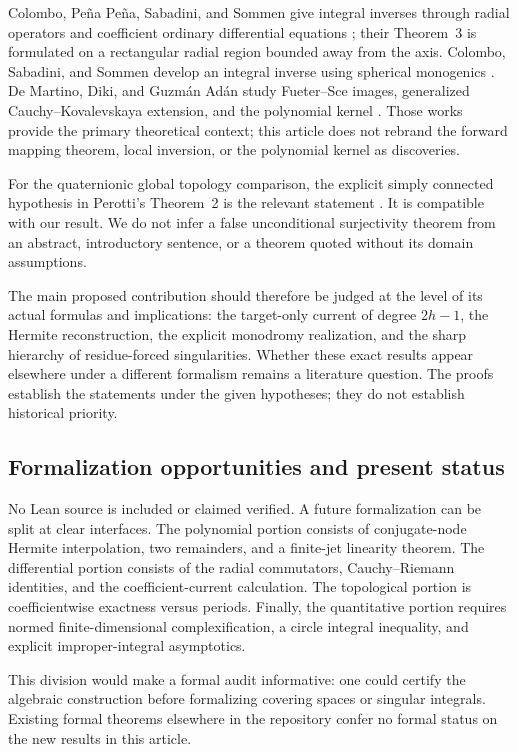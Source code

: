 \documentclass[11pt,a4paper]{article}
\numberwithin{equation}{section}
\theoremstyle{definition}
\theoremstyle{remark}
\begin{document}
Colombo, Pe\~na Pe\~na, Sabadini, and Sommen give integral inverses through
radial operators and coefficient ordinary differential equations
\cite{colombo2014}; their Theorem~3 is formulated on a rectangular radial
region bounded away from the axis. Colombo, Sabadini, and Sommen develop an
integral inverse using spherical monogenics \cite{colombo2013}. De Martino,
Diki, and Guzm\'an Ad\'an study Fueter--Sce images, generalized
Cauchy--Kovalevskaya extension, and the polynomial kernel
\cite{demartino2023}. Those works provide the primary theoretical context;
this article does not rebrand the forward mapping theorem, local inversion,
or the polynomial kernel as discoveries.

For the quaternionic global topology comparison, the explicit simply connected
hypothesis in Perotti's Theorem~2 is the relevant statement
\cite{perotti2024}. It is compatible with our result. We do not infer a false
unconditional surjectivity theorem from an abstract, introductory sentence,
or a theorem quoted without its domain assumptions.

The main proposed contribution should therefore be judged at the level of
its actual formulas and implications: the target-only current of degree
$2h-1$, the Hermite reconstruction, the explicit monodromy realization, and
the sharp hierarchy of residue-forced singularities. Whether these exact
results appear elsewhere under a different formalism remains a literature
question. The proofs establish the statements under the given hypotheses;
they do not establish historical priority.

\subsection{Formalization opportunities and present status}

No Lean source is included or claimed verified. A future formalization can be
split at clear interfaces. The polynomial portion consists of conjugate-node
Hermite interpolation, two remainders, and a finite-jet linearity theorem.
The differential portion consists of the radial commutators, Cauchy--Riemann
identities, and the coefficient-current calculation. The topological portion
is coefficientwise exactness versus periods. Finally, the quantitative portion
requires normed finite-dimensional complexification, a circle integral
inequality, and explicit improper-integral asymptotics.

This division would make a formal audit informative: one could certify the
algebraic construction before formalizing covering spaces or singular
integrals. Existing formal theorems elsewhere in the repository confer no
formal status on the new results in this article.
\end{document}
